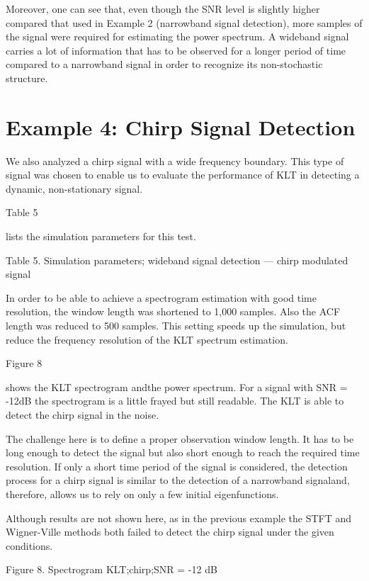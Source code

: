 \documentclass[12pt]{report}
\begin{document}
Moreover, one can see that, even though the SNR level is slightly higher compared that used in Example 2 (narrowband signal detection), more samples of
the signal were required for estimating the power spectrum. A wideband signal carries a lot of information that has to be observed for a longer period of time compared to a narrowband signal in order to recognize its non-stochastic structure.
\section*{Example 4: Chirp Signal Detection}
We also analyzed a chirp signal with a wide frequency boundary. This type of signal was chosen to enable us to evaluate the performance of KLT in detecting
a dynamic, non-stationary signal.\ \begin{normalsize}\color{red}Table 5\end{normalsize} lists the simulation parameters for this test.
\begin{center}
	\color{blue}Table 5. Simulation parameters; wideband signal detection --- chirp modulated signal
\end{center}
In order to be able to achieve a spectrogram estimation with good time resolution, the window length was shortened to 1,000 samples. Also the ACF length was reduced to 500 samples. This setting speeds up the simulation, but reduce the frequency resolution of the KLT spectrum estimation.

\begin{normalsize}\color{red}Figure 8\end{normalsize} shows the KLT spectrogram andthe power spectrum. For a signal with SNR = -12dB the spectrogram is a little frayed but still readable. The KLT is able to detect the chirp signal in the noise. 

The challenge here is to define a proper observation window length. It has to be long enough to detect the signal but also short enough to reach the required time resolution. If only a short time period of the signal is considered, the detection process for a chirp signal is similar to the detection of a narrowband signaland, therefore, allows us to rely on only a few initial eigenfunctions.

Although results are not shown here, as in the previous example the STFT and Wigner-Ville methods both failed to detect the chirp signal under the given conditions.
\begin{center}
	\color{red}Figure 8. Spectrogram KLT;\@ chirp;\@ SNR = -12 dB
\end{center}
\end{document}

